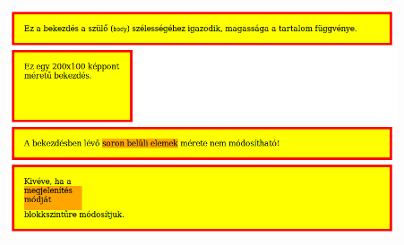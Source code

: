 \begin{frame}
  \begin{columns}[c]
      \begin{exampleblock}{}
        \tiny
        
      \end{exampleblock}
      \includegraphics[width=0.9\textwidth]{dobozMeret.png}
  \end{columns}
  \begin{exampleblock}{\vspace*{-3ex}}
    \tiny
    
  \end{exampleblock}
\end{frame}
